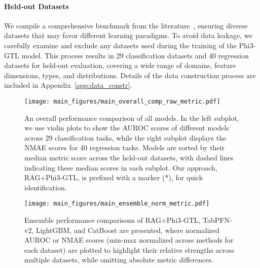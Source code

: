 \paragraph{Held-out Datasets}
We compile a comprehensive benchmark from the literature~\citep{gorishniy2021revisit_tab_dnn,grinsztajn2022tree_gt_tab_nn,gorishniy2024TabR,wen2024GTL}, ensuring diverse datasets that may favor different learning paradigms.
To avoid data leakage, we carefully examine and exclude any datasets used during the training of the Phi3-GTL model.
This process results in 29 classification datasets and 40 regression datasets for held-out evaluation, covering a wide range of domains, feature dimensions, types, and distributions.
Details of the data construction process are included in Appendix~\ref{app:data_constr}.

\begin{figure*}[t]
\vskip 0.2in
\begin{center}
\centerline{\texttt{[image: main\_figures/main\_overall\_comp\_raw\_metric.pdf]}}
\caption{
An overall performance comparison of all models. In the left subplot, we use violin plots to show the AUROC scores of different models across 29 classification tasks, while the right subplot displays the NMAE scores for 40 regression tasks. Models are sorted by their median metric score across the held-out datasets, with dashed lines indicating these median scores in each subplot. Our approach, RAG+Phi3-GTL, is prefixed with a marker (*), for quick identification.
}
\label{fig:overall_comp}
\end{center}
\vskip -0.2in
\end{figure*}

\begin{figure*}[t]
\vskip 0.2in
\begin{center}
\centerline{\texttt{[image: main\_figures/main\_ensemble\_norm\_metric.pdf]}}
\caption{
    Ensemble performance comparisons of RAG+Phi3-GTL, TabPFN-v2, LightGBM, and CatBoost are presented, where normalized AUROC or NMAE scores (min-max normalized across methods for each dataset) are plotted to highlight their relative strengths across multiple datasets, while omitting absolute metric differences.
}
\label{fig:ensemble_res}
\end{center}
\vskip -0.2in
\end{figure*}


